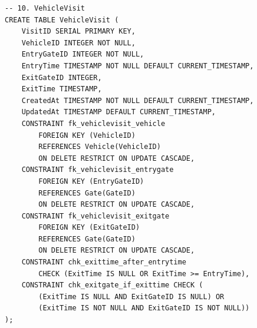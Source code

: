 \documentclass[a4paper, 12pt]{article}
\begin{document}
\begin{lstlisting}[style=sqlstyle, caption={GateGuard Complete Schema (Module A)}, label={lst:full-schema}]
-- 10. VehicleVisit
CREATE TABLE VehicleVisit (
    VisitID SERIAL PRIMARY KEY,
    VehicleID INTEGER NOT NULL,
    EntryGateID INTEGER NOT NULL,
    EntryTime TIMESTAMP NOT NULL DEFAULT CURRENT_TIMESTAMP,
    ExitGateID INTEGER,
    ExitTime TIMESTAMP,
    CreatedAt TIMESTAMP NOT NULL DEFAULT CURRENT_TIMESTAMP,
    UpdatedAt TIMESTAMP DEFAULT CURRENT_TIMESTAMP,
    CONSTRAINT fk_vehiclevisit_vehicle
        FOREIGN KEY (VehicleID)
        REFERENCES Vehicle(VehicleID)
        ON DELETE RESTRICT ON UPDATE CASCADE,
    CONSTRAINT fk_vehiclevisit_entrygate
        FOREIGN KEY (EntryGateID)
        REFERENCES Gate(GateID)
        ON DELETE RESTRICT ON UPDATE CASCADE,
    CONSTRAINT fk_vehiclevisit_exitgate
        FOREIGN KEY (ExitGateID)
        REFERENCES Gate(GateID)
        ON DELETE RESTRICT ON UPDATE CASCADE,
    CONSTRAINT chk_exittime_after_entrytime
        CHECK (ExitTime IS NULL OR ExitTime >= EntryTime),
    CONSTRAINT chk_exitgate_if_exittime CHECK (
        (ExitTime IS NULL AND ExitGateID IS NULL) OR
        (ExitTime IS NOT NULL AND ExitGateID IS NOT NULL))
);
\end{lstlisting}
\endgroup
\end{document}

